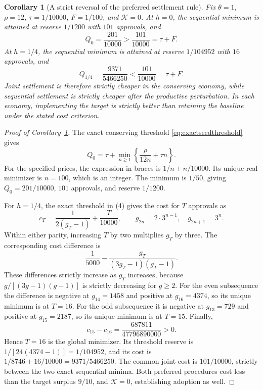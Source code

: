 \documentclass[ecta,draft,supplement]{econsocart}
\newtheorem{corollary}[theorem]{Corollary}
\theoremstyle{definition}
\theoremstyle{definition}
\begin{document}
\begin{appendix}
\begin{corollary}[A strict reversal of the preferred settlement rule]
\label{cor:productivereversal}
Fix $\theta=1$, $\rho=12$, $\tau=1/10000$, $F=1/100$, and $\mathcal K=0$.
At $h=0$, the sequential minimum is attained at reserve $1/1200$ with
$101$ approvals, and
\[
 Q_0=\frac{201}{10000}
 >\frac{101}{10000}=\tau+F.
\]
At $h=1/4$, the sequential minimum is attained at reserve $1/104952$
with $16$ approvals, and
\[
 Q_{1/4}=\frac{9371}{5466250}
 <\frac{101}{10000}=\tau+F.
\]
Joint settlement is therefore strictly cheaper in the conserving economy,
while sequential settlement is strictly cheaper after the productive
perturbation. In each economy, implementing the target is strictly better
than retaining the baseline under the stated cost criterion.
\end{corollary}

\begin{proof}[Proof of Corollary~\ref{cor:productivereversal}]
The exact conserving threshold \eqref{eq:exactseedthreshold} gives
\[
 Q_0=\tau+\min_{n\geq1}
      \left\{\frac{\rho}{12n}+\tau n\right\}.
\]
For the specified prices, the expression in braces is
$1/n+n/10000$. Its unique real minimizer is $n=100$, which is an
integer. The minimum is $1/50$, giving $Q_0=201/10000$,
$101$ approvals, and reserve $1/1200$.

For $h=1/4$, the exact threshold in
\textup{(4)}%
 gives the cost for $T$ approvals as
\[
 c_T=\frac1{2(g_T-1)}+\frac{T}{10000},\qquad
 g_{2n}=2\cdot3^{n-1},\quad g_{2n+1}=3^n.
\]
Within either parity, increasing $T$ by two multiplies $g_T$ by three.
The corresponding cost difference is
\[
 \frac1{5000}-\frac{g_T}{(3g_T-1)(g_T-1)}.
\]
These differences strictly increase as $g_T$ increases, because
$g/[(3g-1)(g-1)]$ is strictly decreasing for $g\geq2$.
For the even subsequence the difference is negative at $g_{14}=1458$
and positive at $g_{16}=4374$, so its unique minimum is at $T=16$.
For the odd subsequence it is negative at $g_{13}=729$ and positive
at $g_{15}=2187$, so its unique minimum is at $T=15$.
Finally,
\[
 c_{15}-c_{16}=\frac{687811}{47796890000}>0.
\]
Hence $T=16$ is the global minimizer. Its threshold reserve is
$1/[24(4374-1)]=1/104952$, and its cost is
$1/8746+16/10000=9371/5466250$.
The common joint cost is $101/10000$, strictly between the two
exact sequential minima. Both preferred procedures cost less than
the target surplus $9/10$, and $\mathcal K=0$, establishing adoption as well.
\end{proof}


\end{appendix}
\end{document}
